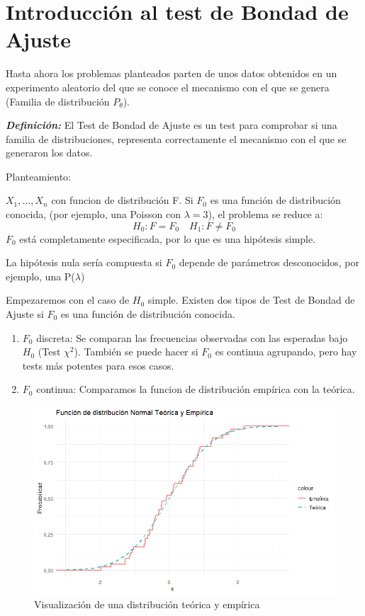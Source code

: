 \section{Introducción al test de Bondad de Ajuste}

Hasta ahora los problemas planteados parten de unos datos obtenidos
en un experimento aleatorio del que se conoce el mecanismo con el que se genera (Familia de distribución $P_\theta$).

\textit{\textbf{Definición: }}El Test de Bondad de Ajuste es un test para comprobar si una familia de distribuciones,
 representa correctamente el mecanismo con el que se generaron los datos.

Planteamiento:

$X_1,\dots,X_n$ con funcion de distribución F. Si $F_0$ es una función de distribución conocida, (por ejemplo, una Poisson con $\lambda=3$), el problema se reduce a:
\[
    H_0: F=F_0 \quad H_1: F \neq F_0
\]
$F_0$ está completamente especificada, por lo que es una hipótesis simple.

La hipótesis nula sería compuesta si $F_0$ depende de parámetros desconocidos, por ejemplo, una P($\lambda$)

Empezaremos con el caso de $H_0$ simple. Existen dos tipos de Test de Bondad de Ajuste si $F_0$ es una función de  distribución conocida.
\begin{enumerate}
    \item $F_0$ discreta: Se comparan las frecuencias observadas con las esperadas bajo $H_0$ (Test $\chi^2$). También se puede hacer si $F_0$ es continua agrupando, pero hay tests más potentes para esos casos.
    \item $F_0$ continua: Comparamos la funcion de distribución empírica con la teórica.
\end{enumerate}

\begin{figure}[h!]
    \centering
    \includegraphics[width=\textwidth]{assets/TeoricaEmpirica.png}
    \caption{Visualización de una distribución teórica y empírica}
    \label{fig:theorical_vs_empirical}
\end{figure}

